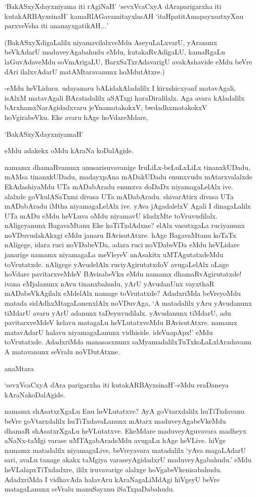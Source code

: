 `BakASxyXdayxniyama iti rAgiNaH' `sevxVcaCxyA dAraparigarxha iti kutakARBAyxsinaH' kamaRlAGavamitayxlasAH `itaHpatitAmapayxsatxyXnu parxveVsha iti ananayxgatikAH$\ldots$'

(BakASxyXdigaLalilx niyamavilalxveMdu AseyuLaLxvarU, yAranunx beVkAdarU maduveyAgabahudu eMdu, kutakaRvAdigaLU, kamaRgaLu laGuvAdaveMdu soVmArigaLU, BarxSaTxrAdavarigU avakAshavide eMdu beVre dAri ilalxvAdarU matAMtaravanunx hoMdutAtxre.)

-eMdu heVLidaru. udayanaru bALidakAladalilx I kirxshicxyanf matavAgali, isAlxM matavAgali BAratadalilx aSATxgi haraDiralilalx. Aga avara kAladalilx bArxhamxNarAgidadxvaru jeYnamatakokxV, bwdadhxmatakokxV hoVgirabeVku. Eke avaru hAge hoVdareMdare,

`BakASxyXdayxniyamaH'

eMdu adakekx oMdu kAraNa koDalAgide.

namamx dhamaRvanunx anusarisuvavanige IruLiLx-beLuLxLiLx tinanxkUDadu, mAMsa tinanxkUDadu, madayxpAna mADakUDadu enunxvudu mAtarxvalalxde EkAdashiyaMdu UTa mADabAradu enunxva doDaDx niyamagaLelAlx ive. alalxde goVkulASaTxmi divasa UTa mADabAradu. shivarAtirx divasa UTa mADabAradu iMtha niyamagaLelAlx ive. yAva jAgadalelxV Agali I dinagaLalilx UTa mADu eMdu heVLuva oMdu niyamavU idadxMte toVruvudilalx. nAligeyanunx BagavaMtanu Eke koTiTxdAdxne? elAlx vasutxgaLa ruciyanunx noVDuvudakAkxgi eMdu janaru BAvisutAtxre. hAge BagavaMtanu koTaTx nAligege, idara ruci noVDabeVDa, adara ruci noVDabeVDa eMdu heVLidare janarige namamx niyamagaLa meVleyeV anAsakitx uMTAgutatxdeMdu toVrutatxde. nAligege yAvudelAlx
ruciyAgirutatxdoV avugaLelAlx oLage hoVdare pavitarxveMdeV BAvisabeVku eMdu namamx dhamaRvAgirutatxde! ivana eMjalanunx nAvu tinanxbahudu, yArU yAvudanUnx vayxthaR mADabeVkAgilalx eMdelAlx namage toVrutatxde? AdadxriMda beVreyoMdu matada sidAdhxMtagaLanenxlAlx noVDuvAga, `A matadalilx yAru yAvudanunx tiMdarU avaru yArU adanunx taDeyuvudilalx. yAvudanunx tiMdarU, adu pavitarxveMdeV kelavu matagaLu heVLutatxveMdu BAvisutAtxre. namamx matavAdarU halavu niyamagaLanunx vidhiside. ideVnapApx!' eMdu toVrutatxde. AdadxriMda 
manasasxnunx saMyamadalilxTuTxkoLaLxlAradavanu A matavanunx seVralu noVDutAtxne.

anaMtara 

`sevxVcaCxyA dAra parigarxha iti kutakARBAyxsinaH'-eMdu eraDaneya kAraNakoDalAgide.

namamx shAsatxrXgaLu Enu heVLutatxve? AyA goVtarxdalilx huTiTxdavanu beVre goVtarxdalilx huTiTxdavaLanunx mAtarx maduveyAgabeVkeMdu dhamaR shAsatxrXgaLu heVLutatxve. EkeMdare maduveyAguvavara madheyx aNaNx-taMgi varase uMTAgabAradeMdu avugaLu hAge heVLive. hiVge 
namamx matadalilx niyamagaLive, beVreyavara matadalilx `yAva magaLAdarU sari, avaLu tanage akakx taMgiya varaseyAgidadxrU maduveyAgabahudu.' eMdu heVLalapxTiTxdadxre, ililx iruvavarige alalxge hoVgabeVkenisabahudu. AdadxriMda I vidhavAda halavAru kAraNagaLiMdAgi 
hiVgeyU beVre matagaLanunx seVralu manuSayxnu iSaTxpaDabahudu.

